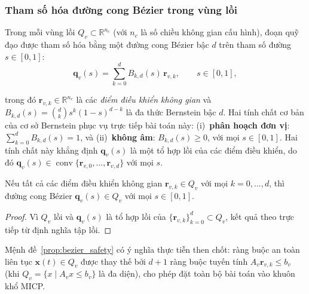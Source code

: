 \subsubsection{Tham số hóa đường cong Bézier trong vùng lồi}
\label{subsubsec:bezier_param}

Trong mỗi vùng lồi $Q_v \subset \mathbb{R}^{n_c}$ (với $n_c$ là số chiều không
gian cấu hình), đoạn quỹ đạo được tham số hóa bằng một đường cong Bézier bậc
$d$ trên tham số đường $s \in [0,1]$:
\begin{equation}
    \mathbf{q}_v(s)
    = \sum_{k=0}^{d} B_{k,d}(s)\, \mathbf{r}_{v,k},
    \qquad s \in [0,1],
    \label{eq:bezier_curve}
\end{equation}

trong đó $\mathbf{r}_{v,k} \in \mathbb{R}^{n_c}$ là các \emph{điểm điều khiển không gian} và $B_{k,d}(s) = \binom{d}{k} s^k (1-s)^{d-k}$ là đa thức Bernstein
bậc $d$. Hai tính chất cơ bản của cơ sở Bernstein phục vụ trực tiếp bài toán này:
(i)~\textbf{phân hoạch đơn vị}: $\sum_{k=0}^{d} B_{k,d}(s) = 1$, và
(ii)~\textbf{không âm}: $B_{k,d}(s) \ge 0$, với mọi $s \in [0,1]$.
Hai tính chất này khẳng định $\mathbf{q}_v(s)$ là một tổ hợp lồi của các điểm
điều khiển, do đó $\mathbf{q}_v(s) \in \operatorname{conv}\{\mathbf{r}_{v,0},
    \ldots, \mathbf{r}_{v,d}\}$ với mọi $s$.

\begin{proposition}
    \label{prop:bezier_safety}
    Nếu tất cả các điểm điều khiển không gian $\mathbf{r}_{v,k} \in Q_v$ với mọi
    $k = 0, \ldots, d$, thì đường cong Bézier $\mathbf{q}_v(s) \in Q_v$ với mọi
    $s \in [0,1]$.
\end{proposition}
\begin{proof}
    Vì $Q_v$ lồi và $\mathbf{q}_v(s)$ là tổ hợp lồi của $\{\mathbf{r}_{v,k}\}_{k=0}^d
        \subset Q_v$, kết quả theo trực tiếp từ định nghĩa tập lồi.
\end{proof}

Mệnh đề~\ref{prop:bezier_safety} có ý nghĩa thực tiễn then chốt: ràng buộc an
toàn liên tục $\mathbf{x}(t) \in Q_v$ được thay thế bởi $d+1$ ràng buộc tuyến
tính $A_v \mathbf{r}_{v,k} \le b_v$ (khi $Q_v = \{x \mid A_v x \le b_v\}$ là đa
diện), cho phép đặt toàn bộ bài toán vào khuôn khổ MICP.

